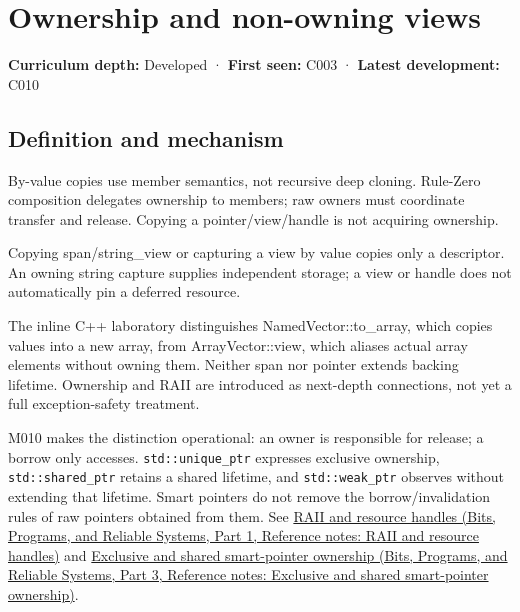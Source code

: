\hypertarget{appendix-d52e4486f527}{}\label{referencestart:appendix-d52e4486f527}
\section{Ownership and non-owning views}\label{appendix-d52e4486f527-ownership-and-non-owning-views}

\hypertarget{appendix-d52e4486f527-ownership-and-non-owning-views}{}

\textbf{Curriculum depth:} Developed · \textbf{First seen:} C003 · \textbf{Latest development:} C010

\begin{allmightroledefinition}

\subsection{Definition and mechanism}\label{appendix-d52e4486f527-definition-and-mechanism}

\hypertarget{appendix-d52e4486f527-definition-and-mechanism}{}

By-value copies use member semantics, not recursive deep cloning. Rule-Zero composition delegates ownership to members; raw owners must coordinate transfer and release. Copying a pointer/view/handle is not acquiring ownership.

\end{allmightroledefinition}

Copying span/string\_view or capturing a view by value copies only a descriptor. An owning string capture supplies independent storage; a view or handle does not automatically pin a deferred resource.

The inline C++ laboratory distinguishes NamedVector::to\_array, which copies values into a new array, from ArrayVector::view, which aliases actual array elements without owning them. Neither span nor pointer extends backing lifetime. Ownership and RAII are introduced as next-depth connections, not yet a full exception-safety treatment.

M010 makes the distinction operational: an owner is responsible for release; a borrow only accesses. \texttt{std::unique\_ptr} expresses exclusive ownership, \texttt{std::shared\_ptr} retains a shared lifetime, and \texttt{std::weak\_ptr} observes without extending that lifetime. Smart pointers do not remove the borrow/invalidation rules of raw pointers obtained from them. See \href{../01-Bits-Programs-and-Reliable-Systems-P01/main.pdf\#nameddest=appendix-69739d3ab49b}{RAII and resource handles (Bits, Programs, and Reliable Systems, Part 1, Reference notes: RAII and resource handles)} and \href{../01-Bits-Programs-and-Reliable-Systems-P03/main.pdf\#nameddest=appendix-51602cabe815}{Exclusive and shared smart-pointer ownership (Bits, Programs, and Reliable Systems, Part 3, Reference notes: Exclusive and shared smart-pointer ownership)}.

